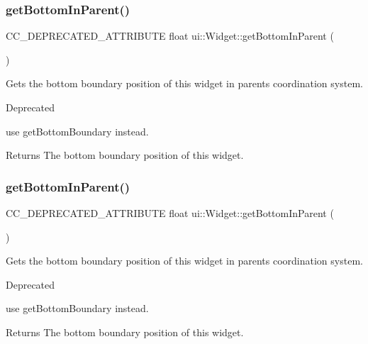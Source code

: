 \subsubsection{\texorpdfstring{get\+Bottom\+In\+Parent()}{getBottomInParent()}\hspace{0.1cm}{\footnotesize\ttfamily [1/2]}}
{\footnotesize\ttfamily C\+C\+\_\+\+D\+E\+P\+R\+E\+C\+A\+T\+E\+D\+\_\+\+A\+T\+T\+R\+I\+B\+U\+TE float ui\+::\+Widget\+::get\+Bottom\+In\+Parent (\begin{DoxyParamCaption}{ }\end{DoxyParamCaption})\hspace{0.3cm}{\ttfamily [inline]}}

Gets the bottom boundary position of this widget in parent\textquotesingle{}s coordination system. \begin{DoxyRefDesc}{Deprecated}
\item[\hyperlink{deprecated__deprecated000169}{Deprecated}]use {\ttfamily get\+Bottom\+Boundary} instead. \end{DoxyRefDesc}
\begin{DoxyReturn}{Returns}
The bottom boundary position of this widget. 
\end{DoxyReturn}
\mbox{\label{classui_1_1Widget_a91d67290067178a0a7534edb06756495}} 
\subsubsection{\texorpdfstring{get\+Bottom\+In\+Parent()}{getBottomInParent()}\hspace{0.1cm}{\footnotesize\ttfamily [2/2]}}
{\footnotesize\ttfamily C\+C\+\_\+\+D\+E\+P\+R\+E\+C\+A\+T\+E\+D\+\_\+\+A\+T\+T\+R\+I\+B\+U\+TE float ui\+::\+Widget\+::get\+Bottom\+In\+Parent (\begin{DoxyParamCaption}{ }\end{DoxyParamCaption})\hspace{0.3cm}{\ttfamily [inline]}}

Gets the bottom boundary position of this widget in parent\textquotesingle{}s coordination system. \begin{DoxyRefDesc}{Deprecated}
\item[\hyperlink{deprecated__deprecated000404}{Deprecated}]use {\ttfamily get\+Bottom\+Boundary} instead. \end{DoxyRefDesc}
\begin{DoxyReturn}{Returns}
The bottom boundary position of this widget. 
\end{DoxyReturn}
\mbox{\label{classui_1_1Widget_a203e45394e7671583ef71c5a9308762e}} 
